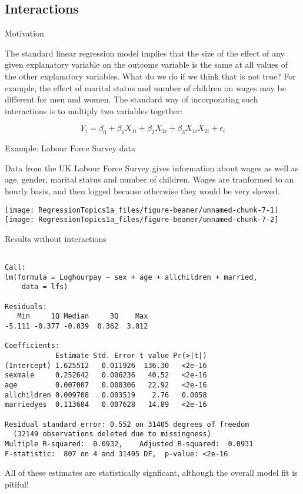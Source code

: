 \documentclass[10pt,ignorenonframetext,]{beamer}
\begin{document}
\subsection{Interactions}\label{interactions}

\begin{frame}{Motivation}

The standard linear regression model implies that the size of the effect
of any given explanatory variable on the outcome variable is the same at
all values of the other explanatory variables. What do we do if we think
that is not true? For example, the effect of marital status and number
of children on wages may be different for men and women. The standard
way of incorporating such interactions is to multiply two variables
together:

\[
Y_i = \beta_0 + \beta_1 X_{1i} + \beta_2 X_{2i} + \beta_3 X_{1i} X_{2i} + \epsilon_i
\]

\end{frame}

\begin{frame}{Example: Labour Force Survey data}

Data from the UK Labour Force Survey gives information about wages as
well as age, gender, marital status and number of children. Wages are
tranformed to an hourly basis, and then logged because otherwise they
would be very skewed.

\texttt{[image: RegressionTopics1a\_files/figure-beamer/unnamed-chunk-7-1]}
\texttt{[image: RegressionTopics1a\_files/figure-beamer/unnamed-chunk-7-2]}

\end{frame}

\begin{frame}[fragile]{Results without interactions}

\footnotesize

\begin{verbatim}

Call:
lm(formula = Loghourpay ~ sex + age + allchildren + married, 
    data = lfs)

Residuals:
   Min     1Q Median     3Q    Max 
-5.111 -0.377 -0.039  0.362  3.012 

Coefficients:
            Estimate Std. Error t value Pr(>|t|)
(Intercept) 1.625512   0.011926  136.30   <2e-16
sexmale     0.252642   0.006236   40.52   <2e-16
age         0.007007   0.000306   22.92   <2e-16
allchildren 0.009708   0.003519    2.76   0.0058
marriedyes  0.113604   0.007628   14.89   <2e-16

Residual standard error: 0.552 on 31405 degrees of freedom
  (32149 observations deleted due to missingness)
Multiple R-squared:  0.0932,    Adjusted R-squared:  0.0931 
F-statistic:  807 on 4 and 31405 DF,  p-value: <2e-16
\end{verbatim}

All of these estimates are statistically signficant, although the
overall model fit is pitiful!

\end{frame}
\end{document}
